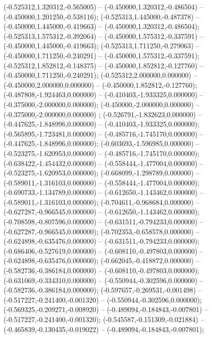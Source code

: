  (-0.525312,1.320312,-0.565005) -- (-0.450000,1.320312,-0.486504) -- (-0.450000,1.201250,-0.538116);
 (-0.525313,1.445000,-0.487378) -- (-0.450000,1.445000,-0.419663) -- (-0.450000,1.320312,-0.486504);
 (-0.525313,1.575312,-0.392064) -- (-0.450000,1.575312,-0.337591) -- (-0.450000,1.445000,-0.419663);
 (-0.525313,1.711250,-0.279063) -- (-0.450000,1.711250,-0.240291) -- (-0.450000,1.575312,-0.337591);
 (-0.525312,1.852812,-0.148375) -- (-0.450000,1.852812,-0.127760) -- (-0.450000,1.711250,-0.240291);
 (-0.525312,2.000000,0.000000) -- (-0.450000,2.000000,0.000000) -- (-0.450000,1.852812,-0.127760);
 (-0.487808,-1.924463,0.000000) -- (-0.410403,-1.933325,0.000000) -- (-0.375000,-2.000000,0.000000);
 (-0.450000,-2.000000,0.000000) -- (-0.375000,-2.000000,0.000000) ;
 (-0.526791,-1.832623,0.000000) -- (-0.447625,-1.848996,0.000000) -- (-0.410403,-1.933325,0.000000);
 (-0.565895,-1.723481,0.000000) -- (-0.485716,-1.745170,0.000000) -- (-0.447625,-1.848996,0.000000);
 (-0.603693,-1.596985,0.000000) -- (-0.523275,-1.620953,0.000000) -- (-0.485716,-1.745170,0.000000);
 (-0.638422,-1.454432,0.000000) -- (-0.558444,-1.477004,0.000000) -- (-0.523275,-1.620953,0.000000);
 (-0.668099,-1.298789,0.000000) -- (-0.589011,-1.316103,0.000000) -- (-0.558444,-1.477004,0.000000);
 (-0.690733,-1.134789,0.000000) -- (-0.612650,-1.143462,0.000000) -- (-0.589011,-1.316103,0.000000);
 (-0.704611,-0.968684,0.000000) -- (-0.627287,-0.966545,0.000000) -- (-0.612650,-1.143462,0.000000);
 (-0.708598,-0.807596,0.000000) -- (-0.631511,-0.794233,0.000000) -- (-0.627287,-0.966545,0.000000);
 (-0.702353,-0.658578,0.000000) -- (-0.624898,-0.635476,0.000000) -- (-0.631511,-0.794233,0.000000);
 (-0.686406,-0.527619,0.000000) -- (-0.608110,-0.497803,0.000000) -- (-0.624898,-0.635476,0.000000);
 (-0.662045,-0.418872,0.000000) -- (-0.582736,-0.386184,0.000000) -- (-0.608110,-0.497803,0.000000);
 (-0.631069,-0.334310,0.000000) -- (-0.550944,-0.302596,0.000000) -- (-0.582736,-0.386184,0.000000);
 (-0.597657,-0.269531,-0.001498) -- (-0.517227,-0.241400,-0.001320) -- (-0.550944,-0.302596,0.000000);
 (-0.569325,-0.209271,-0.008920) -- (-0.489094,-0.184843,-0.007801) -- (-0.517227,-0.241400,-0.001320);
 (-0.545587,-0.151309,-0.021884) -- (-0.465839,-0.130435,-0.019022) -- (-0.489094,-0.184843,-0.007801);
